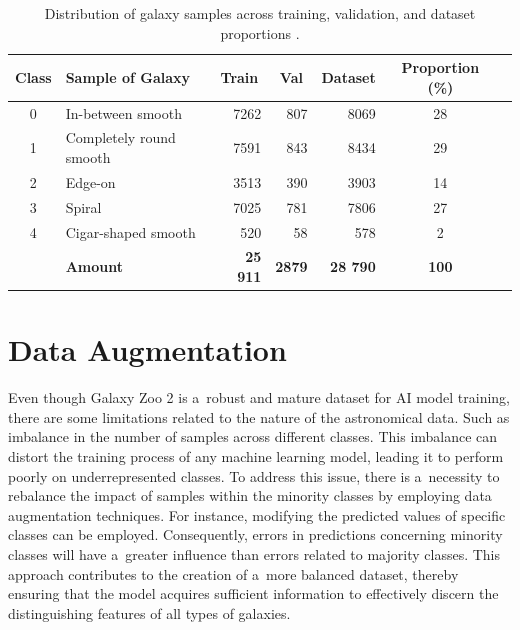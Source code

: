 \begin{table}[hbt]
\centering
\renewcommand{\arraystretch}{1.2}
\begin{tabular}{@{}clrrrcr@{}}
\toprule
Class & Sample of Galaxy       & \multicolumn{1}{c}{Train} & \multicolumn{1}{c}{Val} & \multicolumn{1}{c}{Dataset} & \multicolumn{1}{c}{Proportion (\%)} \\ \midrule
0     & In-between smooth      & 7262                      & 807                      & 8069                          & 28                                    \\
1     & Completely round smooth & 7591                      & 843                      & 8434                          & 29                                    \\
2     & Edge-on                & 3513                      & 390                      & 3903                          & 14                                    \\
3     & Spiral                 & 7025                      & 781                      & 7806                          & 27                                    \\
4     & Cigar-shaped smooth    & 520                       & 58                       & 578                           & 2                                     \\ \midrule
      & \textbf{Amount}        & \textbf{25 911}           & \textbf{2879}            & \textbf{28 790}               & \textbf{100}                          \\ \bottomrule
\end{tabular}
\caption{Distribution of galaxy samples across training, validation, and dataset proportions \cite{Willett_2013}.}
\label{tab:galaxy_samples}
\end{table}

\section{Data Augmentation}
\label{sec:03-data-augmentaiton}

Even though Galaxy Zoo 2 is a~robust and mature dataset for AI model training, there are some limitations related to the nature of the astronomical data. Such as imbalance in the number of samples across different classes. This imbalance can distort the training process of any machine learning model, leading it to perform poorly on underrepresented classes. To address this issue, there is a~necessity to rebalance the impact of samples within the minority classes by employing data augmentation techniques. For instance, modifying the predicted values of specific classes can be employed. Consequently, errors in predictions concerning minority classes will have a~greater influence than errors related to majority classes. This approach contributes to the creation of a~more balanced dataset, thereby ensuring that the model acquires sufficient information to effectively discern the distinguishing features of all types of galaxies.

